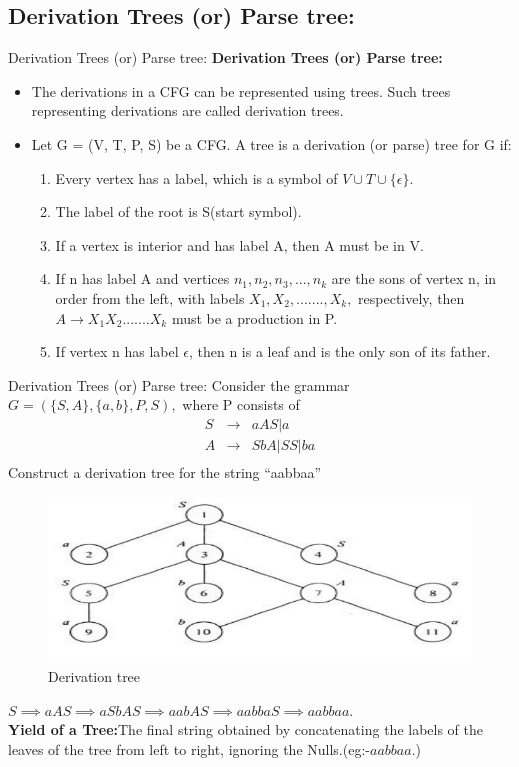 \documentclass{beamer}
\begin{document}
\subsection{Derivation Trees (or) Parse tree:}
\begin{frame}{Derivation Trees (or) Parse tree:}
\textbf{Derivation Trees (or) Parse tree:}
\begin{itemize}
	\item The derivations in a CFG can be represented using trees. Such trees 
	representing derivations are called derivation trees.

	\item Let G = (V, T, P, S) be a CFG. A tree is a derivation (or parse) tree for G if:
	\begin{enumerate}
	 \item Every vertex has a label, which is a symbol of $V \cup T \cup \{\epsilon \}$.
		\item The label of the root is S(start symbol).
		\item If a vertex is interior and has label A, then A must be in V.
		\item If n has label A and vertices $n_1, n_2, n_3, ..., n_k$ are the sons of vertex 	n, in order from the left, with labels $X_1, X_2, ......., X_k,$ respectively, 
		then $A \rightarrow X_1X_2 .......X_k$ must be a production in P.
		\item If vertex n has label $\epsilon$, then n is a leaf and is the only son of its father.

	\end{enumerate}
\end{itemize}
\end{frame}
\begin{frame}{Derivation Trees (or) Parse tree:}
	\small
Consider the grammar $G = (\{S, A\}, \{a, b\}, P, S),$ where P consists of
	\begin{eqnarray*}
		S  &\rightarrow& aAS | a\\
		A &\rightarrow&  SbA|SS|ba\\
	\end{eqnarray*}
	Construct a derivation tree for the string “aabbaa”
	\begin{figure}
		\includegraphics[scale=.3]{img3/m1}
		\caption{Derivation tree}
	\end{figure}
$S \implies aAS \implies aSbAS \implies aabAS \implies aabbaS \implies aabbaa.$\\
\textbf{Yield of a Tree:}The final string obtained by concatenating the labels of the leaves of the tree from left to right, ignoring the Nulls.(eg:-$aabbaa.$)
\end{frame}
\end{document}
